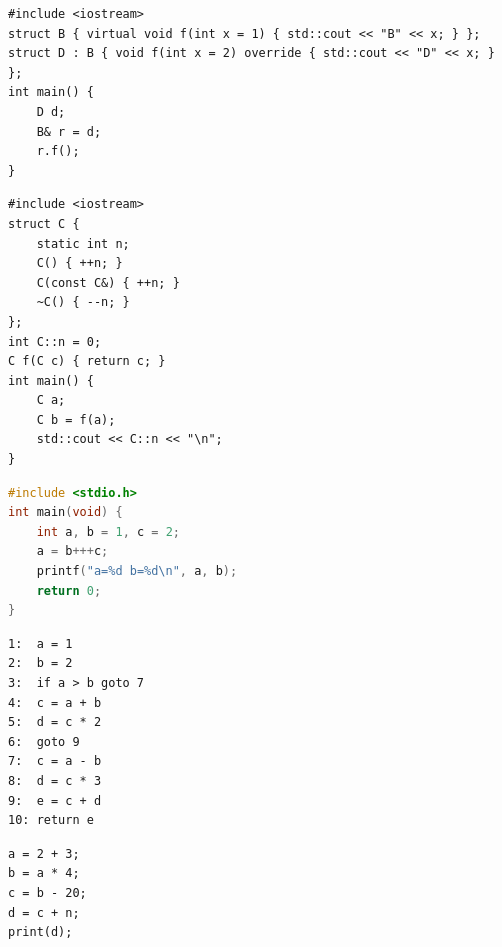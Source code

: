 \documentclass[10pt,a4paper,openany,oneside]{report}
\begin{document}
\begin{lstlisting}[language={[11]C++},basicstyle=\ttfamily\scriptsize]
#include <iostream>
struct B { virtual void f(int x = 1) { std::cout << "B" << x; } };
struct D : B { void f(int x = 2) override { std::cout << "D" << x; } };
int main() {
    D d;
    B& r = d;
    r.f();
}
\end{lstlisting}
\begin{lstlisting}[language={[11]C++},basicstyle=\ttfamily\scriptsize]
#include <iostream>
struct C {
    static int n;
    C() { ++n; }
    C(const C&) { ++n; }
    ~C() { --n; }
};
int C::n = 0;
C f(C c) { return c; }
int main() {
    C a;
    C b = f(a);
    std::cout << C::n << "\n";
}
\end{lstlisting}
\begin{lstlisting}[language={C},basicstyle=\ttfamily\scriptsize]
#include <stdio.h>
int main(void) {
    int a, b = 1, c = 2;
    a = b+++c;
    printf("a=%d b=%d\n", a, b);
    return 0;
}
\end{lstlisting}
\begin{lstlisting}[basicstyle=\ttfamily\scriptsize]
1:  a = 1
2:  b = 2
3:  if a > b goto 7
4:  c = a + b
5:  d = c * 2
6:  goto 9
7:  c = a - b
8:  d = c * 3
9:  e = c + d
10: return e
\end{lstlisting}
\begin{lstlisting}[basicstyle=\ttfamily\scriptsize]
a = 2 + 3;
b = a * 4;
c = b - 20;
d = c + n;
print(d);
\end{lstlisting}
\end{document}
